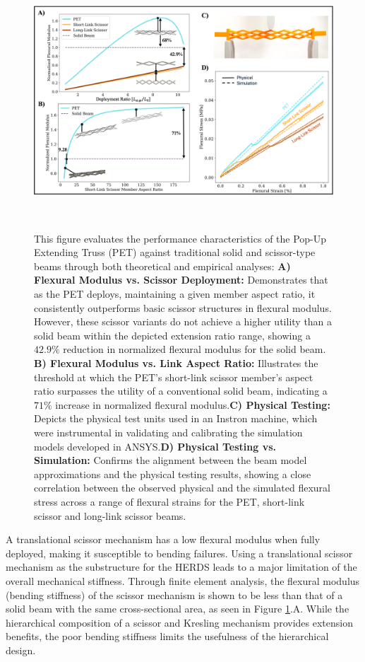 \begin{figure}
\end{figure}

\begin{figure}
    \centering
    \includegraphics[width=\linewidth]{Figures/Figure3 - pet testing 07-10.png}
    \centering
    \caption{This figure evaluates the performance characteristics of the Pop-Up Extending Truss (PET) against traditional solid and scissor-type beams through both theoretical and empirical analyses: \textbf{A) Flexural Modulus vs. Scissor Deployment:}  Demonstrates that as the PET deploys, maintaining a given member aspect ratio, it consistently outperforms basic scissor structures in flexural modulus. However, these scissor variants do not achieve a higher utility than a solid beam within the depicted extension ratio range, showing a $42.9\%$ reduction in normalized flexural modulus for the solid beam. \textbf{B) Flexural Modulus vs. Link Aspect Ratio:} Illustrates the threshold at which the PET's short-link scissor member's aspect ratio surpasses the utility of a conventional solid beam, indicating a $71\%$ increase in normalized flexural modulus.\@\textbf{C) Physical Testing:} Depicts the physical test units used in an Instron machine, which were instrumental in validating and calibrating the simulation models developed in ANSYS.\@\textbf{D) Physical Testing vs. Simulation:} Confirms the alignment between the beam model approximations and the physical testing results, showing a close correlation between the observed physical and the simulated flexural stress across a range of flexural strains for the PET, short-link scissor and long-link scissor beams.}~\label{fig:flex_comp}
\end{figure}
A translational scissor mechanism has a low flexural modulus when fully deployed, making it susceptible to bending failures. Using a translational scissor mechanism as the substructure for the HERDS leads to a major limitation of the overall mechanical stiffness. Through finite element analysis, the flexural modulus (bending stiffness) of the scissor mechanism is shown to be less than that of a solid beam with the same cross-sectional area, as seen in Figure \ref{fig:flex_comp}.A. While the hierarchical composition of a scissor and Kresling mechanism provides extension benefits, the poor bending stiffness limits the usefulness of the hierarchical design. 

